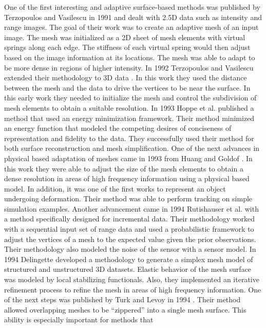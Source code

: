One of the first interesting and adaptive surface-based methods was published by
Terzopoulos and Vasilescu in 1991 \cite{Terzopoulos1991a} and dealt with 2.5D
data such as intensity and range images. The goal of their work was to create an
adaptive mesh of an input image. The mesh was initialized as a 2D sheet of mesh
elements with virtual springs along each edge. The stiffness of each virtual
spring would then adjust based on the image information at its locations. The
mesh was able to adapt to be more dense in regions of higher intensity. In 1992
Terzopoulos and Vasilescu extended their methodology to 3D data
\cite{Vasilescu1992}. In this work they used the distance between the mesh and
the data to drive the vertices to be near the surface. In this early work they
needed to initialize the mesh and control the subdivision of mesh elements to
obtain a suitable resolution. In 1993 Hoppe et al. \cite{Hoppe1993} published a
method that used an energy minimization framework. Their method minimized an
energy function that modeled the competing desires of conciseness of
representation and fidelity to the data. They successfully used their method for
both surface reconstruction and mesh simplification. One of the next advances
in physical based adaptation of meshes came in 1993 from Huang and Goldof
\cite{Huang1993}. In this work they were able to adjust the size of the mesh
elements to obtain a dense resolution in areas of high frequency information
using a physical based model. In addition, it was one of the first works to
represent an object undergoing deformation. Their method was able to perform
tracking on simple simulation examples. Another advancement came in 1994
Rutishauser et al. \cite{Rutishauser1994} with a method specifically designed
for incremental data. Their methodology worked with a sequential input set of
range data and used a probabilistic framework to adjust the vertices of a mesh
to the expected value given the prior observations. Their methodology also
modeled the noise of the sensor with a sensor model. In 1994 Delingette
\cite{Delingette1994} developed a methodology to generate a simplex mesh model
of structured and unstructured 3D datasets. Elastic behavior of the mesh surface
was modeled by local stabilizing functionals. Also, they implemented an
iterative refinement process to refine the mesh in areas of high frequency
information. One of the next steps was published by Turk and Levoy in 1994
\cite{Turk1994}. Their method allowed overlapping meshes to be ``zippered'' into
a single mesh surface. This ability is especially important for methods that
